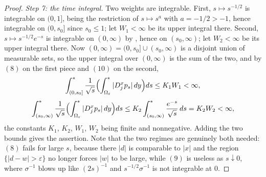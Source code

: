\begin{proof}
\emph{Step 7: the time integral.}
Two weights are integrable.  First, $s \mapsto s^{-1/2}$ is integrable on
$(0,1]$, being the restriction of $s \mapsto s^{a}$ with $a = -1/2 > -1$, hence
integrable on $(0,s_0]$ since $s_0 \leq 1$; let $W_1 < \infty$ be its upper
integral there.  Second, $s \mapsto s^{-1/2}e^{-s}$ is integrable on
$(0,\infty)$ by , hence on
$(s_0,\infty)$; let $W_2 < \infty$ be its upper integral there.  Now
$(0,\infty) = (0,s_0] \cup (s_0,\infty)$ is a disjoint union of measurable sets,
so the upper integral over $(0,\infty)$ is the sum of the two, and by $(8)$ on
the first piece and $(10)$ on the second,
\[
  \int^*_{(0,s_0]} \frac{1}{\sqrt s}
    \Bigl(\int^*_{\Omega_\varepsilon}|D_j^xp_s|\,dy\Bigr) ds
    \leq K_1 W_1 < \infty ,
\]
\[
  \int^*_{(s_0,\infty)} \frac{1}{\sqrt s}
    \Bigl(\int^*_{\Omega_\varepsilon}|D_j^xp_s|\,dy\Bigr) ds
    \leq K_2 \int^*_{(s_0,\infty)} \frac{e^{-s}}{\sqrt s}\,ds
    = K_2 W_2 < \infty ,
\]
the constants $K_1$, $K_2$, $W_1$, $W_2$ being finite and nonnegative.  Adding
the two bounds gives the assertion.  Note that the two regimes are genuinely
both needed: $(8)$ fails for large $s$, because there $|d|$ is comparable to
$|x|$ and the region $\{|d-w| > \varepsilon\}$ no longer forces $|w|$ to be
large, while $(9)$ is useless as $s \downarrow 0$, where $\sigma^{-1}$ blows up
like $(2s)^{-1}$ and $s^{-1/2}\sigma^{-1}$ is not integrable at $0$.
\end{proof}
